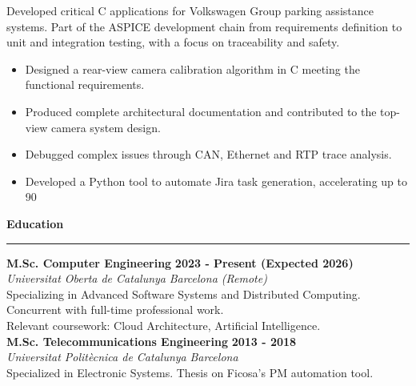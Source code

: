 \documentclass[11pt,a4paper]{article}
\newcommand{\cvsection}[1]{
    \vspace{0.5em}
    \noindent\textbf{\large #1}
    \vspace{0.5em}
    \hrule\vspace{0.5em}
}
\begin{document}
\begin{minipage}[t]{0.68\textwidth}
    Developed critical C applications for Volkswagen Group parking assistance systems. Part of the ASPICE development chain from requirements definition to unit and integration testing, 
    with a focus on traceability and safety.
    \begin{itemize}[leftmargin=*,topsep=2pt,itemsep=-1pt]
        \item Designed a rear-view camera calibration algorithm in C meeting the functional requirements.
        \item Produced complete architectural documentation and contributed to the top-view camera system design.
        \item Debugged complex issues through CAN, Ethernet and RTP trace analysis.
        \item Developed a Python tool to automate Jira task generation, accelerating up to 90%
    \end{itemize}
    
    \cvsection{Education}
    \noindent
    \textbf{M.Sc. Computer Engineering} \hfill \textbf{2023 - Present (Expected 2026)} \\
    \textit{Universitat Oberta de Catalunya} \hfill \textit{Barcelona (Remote)} \\
    Specializing in Advanced Software Systems and Distributed Computing.\\
    Concurrent with full-time professional work.\\
    Relevant coursework: Cloud Architecture, Artificial Intelligence.\\
    \noindent
    \textbf{M.Sc. Telecommunications Engineering} \hfill \textbf{2013 - 2018} \\
    \textit{Universitat Politècnica de Catalunya} \hfill \textit{Barcelona}\\
    Specialized in Electronic Systems. Thesis on Ficosa's PM automation tool.\\    
\end{minipage}
\hspace{0.02\textwidth} %
\end{document}
